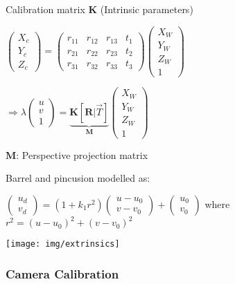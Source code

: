 \documentclass[fontsize=6pt]{scrartcl}
\newcommand{\mat}[1]{\mathbf{#1}}
\begin{document}
\begin{multicols*}{4}
Calibration matrix $\mat K$ (Intrinsic parameters)

$
\begin{pmatrix}
X_c\\
Y_c\\
Z_c
\end{pmatrix}
= 
\left(\begin{array}{ccc|c}  
r_{11} & r_{12} & r_{13} & t_1\\
r_{21} & r_{22} & r_{23} & t_2\\
r_{31} & r_{32} & r_{33} & t_3
\end{array}\right)
\begin{pmatrix}
X_W\\
Y_W\\
Z_W\\
1
\end{pmatrix}
$

\begin{minipage}{0.6\linewidth}
	$\Rightarrow \lambda \begin{pmatrix}
	u\\
	v\\
	1
	\end{pmatrix}
	= 
	\underbrace{\mat K \left[\mat R | \vec T\right]}_{\mat M}
	\begin{pmatrix}
	X_W\\
	Y_W\\
	Z_W\\
	1
	\end{pmatrix}
	$
	
	$\mat M $: Perspective projection matrix
	
	Barrel and pincusion modelled as:
	
	$
	\begin{pmatrix}
		u_d\\
		v_d
	\end{pmatrix}
	= (1+k_1 r^2)
	\begin{pmatrix}
	u - u_0\\
	v - v_0
	\end{pmatrix}
	+
	\begin{pmatrix}
	u_0\\
	v_0
	\end{pmatrix}
	$
	where $r^2 = (u-u_0)^2 + (v-v_0)^2$
\end{minipage}
\begin{minipage}{0.4\linewidth}
	\texttt{[image: img/extrinsics]}
\end{minipage}

\subsubsection*{Camera Calibration}


\end{multicols*}
\end{document}
